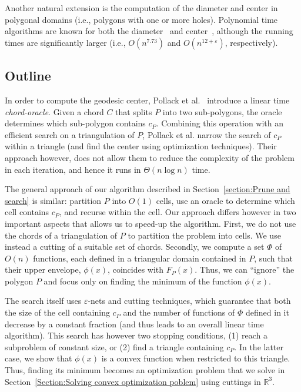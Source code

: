 \documentclass[a4paper,UKenglish]{lipics}
\newcommand{\F}[2]{\ensuremath{F_{\scriptscriptstyle #1}(#2)}}
\newcommand{\cp}{\ensuremath{c_P}}
\begin{document}
Another natural extension is the computation of the diameter and center in polygonal domains (i.e., polygons with one or more holes). Polynomial time algorithms are known for both the diameter~\cite{bko-gdpd-13} and center~\cite{bko-cgcpd-14}, although the running times are significantly larger (i.e., $O(n^{7.73})$ and $O(n^{12+\varepsilon})$, respectively).

\subsection{Outline}
In order to compute the geodesic center, Pollack et al.~\cite{pollackComputingCenter} introduce a linear time \emph{chord-oracle}. Given a chord $C$ that splits $P$ into two sub-polygons, the oracle determines which sub-polygon contains $\cp$. Combining this operation with an efficient search on a triangulation of $P$, Pollack et al. narrow the search of $\cp$ within a triangle (and find the center using optimization techniques). Their approach however, does not allow them to reduce the complexity of the problem in each iteration, and hence it runs in $\Theta(n\log n)$ time. 

The general approach of our algorithm described in Section~\ref{section:Prune and search} is similar: 
partition $P$ into $O(1)$ cells, use an oracle to determine which cell contains $\cp$, and recurse within the cell. 
Our approach differs however in two important aspects that allows us to speed-up the algorithm. 
First, we do not use the chords of a triangulation of $P$ to partition the problem into cells. 
We use instead a cutting of a suitable set of chords.
Secondly, we compute a set $\Phi$ of $O(n)$ functions, each defined in a triangular domain contained in $P$, such that their upper envelope, $\phi(x)$, coincides with $\F{P}{x}$. 
Thus, we can ``ignore'' the polygon $P$ and focus only on finding the minimum of the function $\phi(x)$. 

The search itself uses $\varepsilon$-nets and cutting techniques,
which guarantee that both the size of the cell containing $\cp$ and the number of functions of $\Phi$ defined in it decrease by a constant fraction 
(and thus leads to an overall linear time algorithm).
This search has however two stopping conditions, (1) reach a subproblem of constant size, 
or (2) find a triangle containing $\cp$.
In the latter case, 
we show that $\phi(x)$ is a convex function when restricted to this triangle. 
Thus, finding its minimum becomes an optimization problem that we solve in Section~\ref{Section:Solving convex optimization poblem} using cuttings in $\mathbb{R}^3$.
\end{document}
